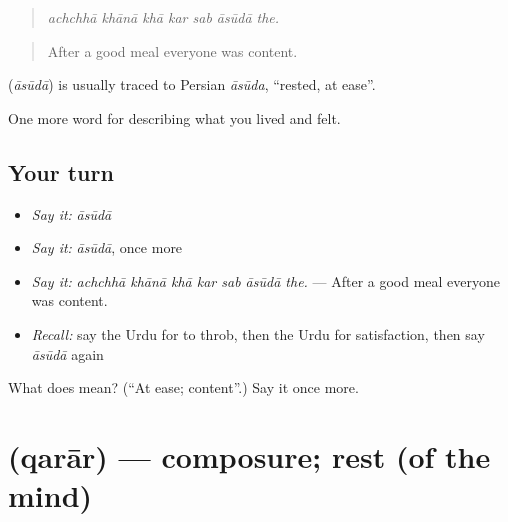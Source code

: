 \begin{quote}
      
\end{quote}

\begin{quote}
\emph{achchhā khānā khā kar sab āsūdā the.}
\end{quote}

\begin{quote}
After a good meal everyone was content.
\end{quote}

\begin{cousinweb}
\textbf{} (\emph{āsūdā}) is usually traced to Persian \emph{āsūda}, \textquotedblleft{}rested, at ease\textquotedblright{}.
\end{cousinweb}

\begin{grammarlens}[title={What you've built}]
One more word for describing what you lived and felt.
\end{grammarlens}

\subsection*{Your turn}
\begin{itemize}
\raggedright
  \item \emph{Say it:} \emph{āsūdā}
  \item \emph{Say it:} \emph{āsūdā}, once more
  \item \emph{Say it:} \emph{achchhā khānā khā kar sab āsūdā the.} — After a good meal everyone was content.
  \item \emph{Recall:} say the Urdu for to throb, then the Urdu for satisfaction, then say \emph{āsūdā} again
\end{itemize}

\begin{tcolorbox}[breakable,colback=teal!4,colframe=teal!35!black,title={Before you move on}]
What does  mean? (\textquotedblleft{}At ease; content\textquotedblright{}.) Say it once more.
\end{tcolorbox}
\section[\texorpdfstring{\ur{قرار} (qarār)}{قرار (qarār)}]{ (qarār) — composure; rest (of the mind)}

\label{lesson:UR-C447-qarar}




